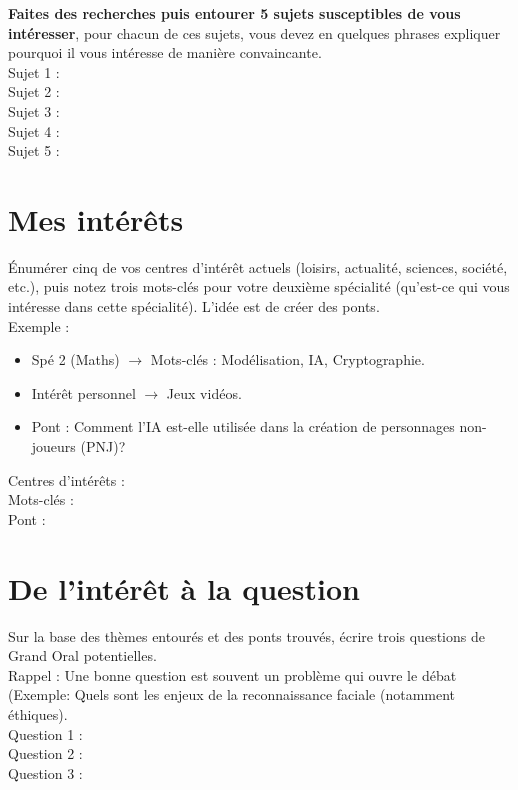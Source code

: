 \newpage

\textbf{Faites des recherches puis entourer 5 sujets susceptibles de vous intéresser}, pour chacun de ces sujets, vous devez en quelques phrases expliquer pourquoi il vous intéresse de manière convaincante.\\

\noindent Sujet 1 :
\vspace{1cm}\\
Sujet 2 :
\vspace{1cm}\\
Sujet 3 :
\vspace{1cm}\\
Sujet 4 :
\vspace{1cm}\\
Sujet 5 :
\vspace{1cm}

\section{Mes intérêts}

Énumérer cinq de vos centres d'intérêt actuels (loisirs, actualité, sciences, société, etc.), puis notez trois mots-clés pour votre deuxième spécialité (qu'est-ce qui vous intéresse dans cette spécialité).
L'idée est de créer des ponts.\\
Exemple :
\begin{itemize}
    \item Spé 2 (Maths) $\rightarrow$ Mots-clés : Modélisation, IA, Cryptographie.
    \item Intérêt personnel $\rightarrow$ Jeux vidéos.
    \item Pont : Comment l'IA est-elle utilisée dans la création de personnages non-joueurs (PNJ)?
\end{itemize}
\vspace{0.5cm}
\noindent Centres d'intérêts :
\vspace{1cm}\\
Mots-clés :
\vspace{1cm}\\
Pont :
\vspace{1cm}

\section{De l'intérêt à la question}

 Sur la base des thèmes entourés et des ponts trouvés, écrire trois questions de Grand Oral potentielles.\\

Rappel : Une bonne question est souvent un problème qui ouvre le débat (Exemple: Quels sont les enjeux de la reconnaissance faciale (notamment éthiques).\\

\noindent Question 1 :
\vspace{1cm}\\
Question 2 :
\vspace{1cm}\\
Question 3 :
\vspace{1cm}